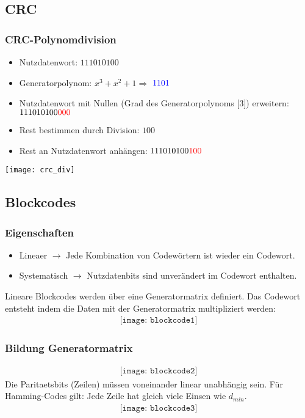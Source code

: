 \subsection{CRC}
\subsubsection{CRC-Polynomdivision}
\begin{itemize}
	\item Nutzdatenwort: $111010100$
	\item Generatorpolynom: $x^3 + x^2 + 1 \Rightarrow$ $\textcolor{blue}{1101}$
	\item Nutzdatenwort mit Nullen (Grad des Generatorpolynoms [3]) erweitern: $111010100\textcolor{red}{000}$
	\item Rest bestimmen durch Division: $100$
	\item Rest an Nutzdatenwort anhängen: $111010100\textcolor{red}{100}$
\end{itemize}
\texttt{[image: crc\_div]}
\subsection{Blockcodes}
\subsubsection{Eigenschaften}
\begin{itemize}
	\item Lineaer $\rightarrow$ Jede Kombination von Codewörtern ist wieder ein Codewort.
	\item Systematisch $\rightarrow$ Nutzdatenbits sind unverändert im Codewort enthalten.
\end{itemize}

Lineare Blockcodes werden über eine Generatormatrix
definiert. Das Codewort entsteht indem die Daten mit der
Generatormatrix multipliziert werden:\\
\begin{align*}
    \texttt{[image: blockcode1]}
\end{align*}
\subsubsection{Bildung Generatormatrix}
\begin{align*}
    \texttt{[image: blockcode2]}
\end{align*}
Die Paritaetsbits (Zeilen) müssen voneinander linear unabhängig sein.
Für Hamming-Codes gilt: Jede Zeile hat gleich viele Einsen wie $d_{min}$.
\begin{align*}
    \texttt{[image: blockcode3]}
\end{align*}
